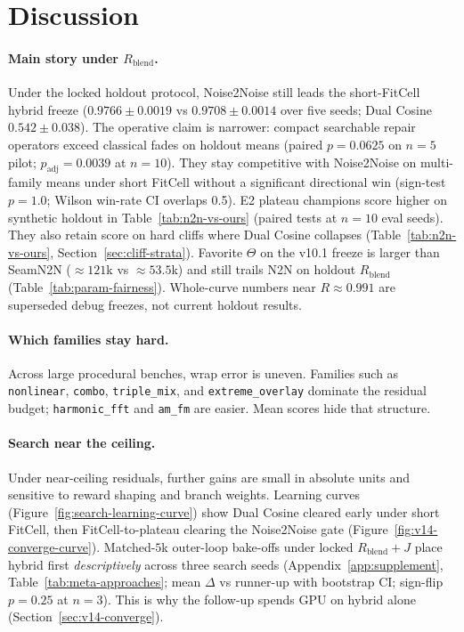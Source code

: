 \section{Discussion}
\label{sec:discussion}

\paragraph{Main story under $R_{\mathrm{blend}}$.}
Under the locked holdout protocol, Noise2Noise still leads the short-FitCell hybrid freeze
($0.9766{\pm}0.0019$ vs $0.9708{\pm}0.0014$ over five seeds; Dual Cosine $0.542{\pm}0.038$).
The operative claim is narrower: compact searchable repair operators exceed classical fades on holdout means (paired $p{=}0.0625$ on $n{=}5$ pilot; $p_{\mathrm{adj}}{=}0.0039$ at $n{=}10$). They stay competitive with Noise2Noise on multi-family means under short FitCell without a significant directional win (sign-test $p{=}1.0$; Wilson win-rate CI overlaps 0.5). E2 plateau champions score higher on synthetic holdout in Table~\ref{tab:n2n-vs-ours} (paired tests at $n{=}10$ eval seeds). They also retain score on hard cliffs where Dual Cosine collapses
(Table~\ref{tab:n2n-vs-ours}, Section~\ref{sec:cliff-strata}).
Favorite $\Theta$ on the v10.1 freeze is larger than SeamN2N (${\approx}121$k vs ${\approx}53.5$k) and still trails N2N on holdout $R_{\mathrm{blend}}$
(Table~\ref{tab:param-fairness}).
Whole-curve numbers near $R{\approx}0.991$ are superseded debug freezes, not current holdout results.

\paragraph{Which families stay hard.}
Across large procedural benches, wrap error is uneven.
Families such as \texttt{nonlinear}, \texttt{combo}, \texttt{triple\_mix}, and \texttt{extreme\_overlay} dominate the residual budget;
\texttt{harmonic\_fft} and \texttt{am\_fm} are easier.
Mean scores hide that structure.

\paragraph{Search near the ceiling.}
Under near-ceiling residuals, further gains are small in absolute units and sensitive to reward shaping and branch weights.
Learning curves (Figure~\ref{fig:search-learning-curve}) show Dual Cosine cleared early under short FitCell,
then FitCell-to-plateau clearing the Noise2Noise gate (Figure~\ref{fig:v14-converge-curve}).
Matched-$5$k outer-loop bake-offs under locked $R_{\mathrm{blend}}{+}J$ place hybrid first \emph{descriptively} across three search seeds
(Appendix~\ref{app:supplement}, Table~\ref{tab:meta-approaches}; mean $\Delta$ vs runner-up with bootstrap CI; sign-flip $p{=}0.25$ at $n{=}3$). This is why the follow-up spends GPU on hybrid alone
(Section~\ref{sec:v14-converge}).

